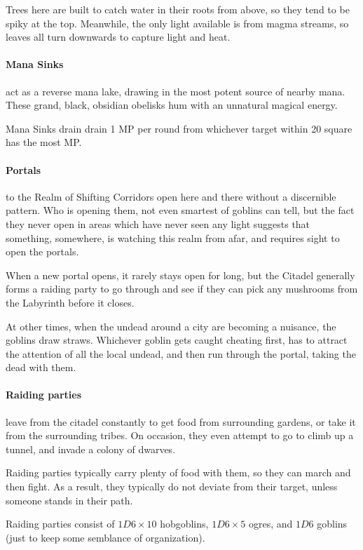 \begin{multicols}{2}
Trees here are built to catch water in their roots from above, so they tend to be spiky at the top.
Meanwhile, the only light available is from magma streams, so leaves all turn downwards to capture light and heat.

\paragraph{Mana Sinks}
act as a reverse mana lake, drawing in the most potent source of nearby mana.
These grand, black, obsidian obelisks hum with an unnatural magical energy.

Mana Sinks drain drain 1 MP per round from whichever target within 20 square has the most MP.

\paragraph{Portals}
to the Realm of Shifting Corridors open here and there without a discernible pattern.
Who is opening them, not even smartest of goblins can tell, but the fact they never open in areas which have never seen any light suggests that something, somewhere, is watching this realm from afar, and requires sight to open the portals.

When a new portal opens, it rarely stays open for long, but the Citadel generally forms a raiding party to go through and see if they can pick any mushrooms from the Labyrinth before it closes.

At other times, when the undead around a city are becoming a nuisance, the goblins draw straws.
Whichever goblin gets caught cheating first, has to attract the attention of all the local undead, and then run through the portal, taking the dead with them.

\paragraph{Raiding parties}
leave from the citadel constantly to get food from surrounding gardens, or take it from the surrounding tribes.
On occasion, they even attempt to go to climb up a tunnel, and invade a colony of dwarves.

Raiding parties typically carry plenty of food with them, so they can march and then fight.
As a result, they typically do not deviate from their target, unless someone stands in their path.

Raiding parties consist of $1D6 \times 10$ hobgoblins, $1D6 \times 5$ ogres, and $1D6$ goblins (just to keep some semblance of organization).


\end{multicols}
